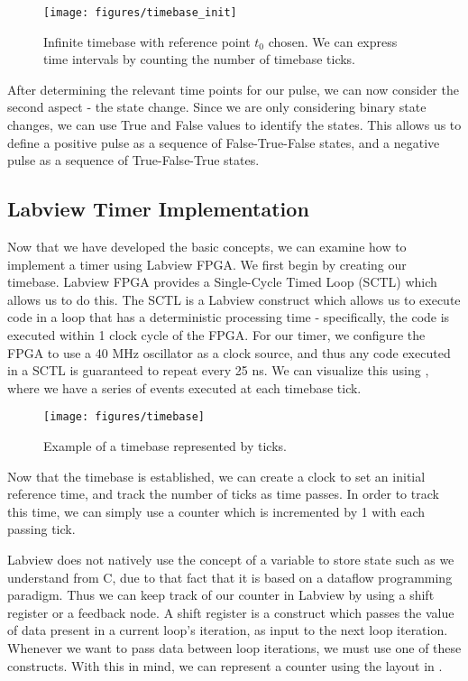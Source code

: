 \begin{figure}[!ht] 
 \centering 
 \texttt{[image: figures/timebase\_init]} 
 \caption[Timebase With Reference Point]{Infinite timebase with reference point $t_0$ chosen.  We can express time intervals by counting the number of timebase ticks.} 
 \label{fig:timebase_init} 
\end{figure}


After determining the relevant time points for our pulse, we can now consider the second aspect - the state change.  Since we are only considering binary state changes, we can use True and False values to identify the states.  This allows us to define a positive pulse as a sequence of False-True-False states, and a negative pulse as a sequence of True-False-True states.


\subsection{Labview Timer Implementation} 
\label{timer} 

Now that we have developed the basic concepts, we can examine how to implement
a timer using Labview FPGA.  We first begin by creating our timebase.  Labview
FPGA provides a Single-Cycle Timed Loop (SCTL) which allows us to do this.
The SCTL is a Labview construct which allows us to execute code in a loop that
has a deterministic processing time - specifically, the code is executed
within 1 clock cycle of the FPGA.  For our timer, we configure the FPGA to use
a 40 MHz oscillator as a clock source, and thus any code executed in a SCTL is
guaranteed to repeat every 25 ns.  We can visualize this using , where we have a series of events executed at each timebase tick.

\begin{figure}[!ht] 
 \centering 
 \texttt{[image: figures/timebase]} 
 \caption[Timebase]{Example of a timebase represented by ticks.} 
 \label{fig:timebase} 
\end{figure}


Now that the timebase is established, we can create a clock to set an initial
reference time, and track the number of ticks as time passes.  In order to
track this time, we can simply use a counter which is incremented by 1 with
each passing tick.

Labview does not natively use the concept of a variable to store state such
as we understand from C, due to that fact that it is based on a dataflow
programming paradigm.  Thus we can keep track of our counter in Labview by
using a shift register or a feedback node.  A shift register is a construct
which passes the value of data present in a current loop's iteration, as input
to the next loop iteration.  Whenever we want to pass data between loop
iterations, we must use one of these constructs.  With this in mind, we can
represent a counter using the layout in .

